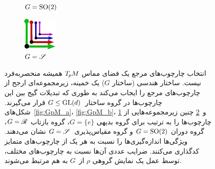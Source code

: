 \begin{figure}[htbp]
\begin{subfigure}[b]{0.22\textwidth}
		\caption{\small $G=\operatorname{SO}(2)$}
		\label{fig:GpM_c}
	\end{subfigure}
	\hfill
	\begin{subfigure}[b]{0.22\textwidth}
		\centering
		\includegraphics[width=0.8\linewidth]{figures/GpM_scale.pdf}
		\caption{\small $G=\mathscr{S}$}
		\label{fig:GpM_d}
	\end{subfigure}
	
	\caption{\small
		انتخاب چارچوب‌های مرجع یک فضای مماس $T_{\mkern-1.5mu p}\mkern-.5muM$ همیشه منحصربه‌فرد نیست.
		ساختار هندسی (ساختار $G$) یک خمینه، زیرمجموعه‌ای ارجح از چارچوب‌های مرجع را ایجاب می‌کند به طوری که تبدیلات گیج بین این چارچوب‌ها در گروه ساختار~$G\leq\operatorname{GL}(d)$ قرار می‌گیرند.
		شکل‌های~\ref{fig:GpM_a}، \ref{fig:GpM_b}، \ref{fig:GpM_c} و~\ref{fig:GpM_d}
		چنین زیرمجموعه‌هایی از چارچوب‌ها را به ترتیب برای گروه بدیهی $G=\{e\}$، گروه بازتاب $G=\mathscr{R}$، گروه دوران $G=\operatorname{SO}(2)$ و گروه مقیاس‌پذیری~$G=\mathscr{S}$ نشان می‌دهند.
		ویژگی‌ها اندازه‌گیری‌ها را نسبت به هر یک از چارچوب‌های متمایز کدگذاری می‌کنند.
		ضرایب عددی آن‌ها نسبت به چارچوب‌های مختلف، توسط عمل یک نمایش گروهی $\rho$ از~$G$ به هم مرتبط می‌شوند.
	}
	\label{fig:GpM_examples}
\end{figure}


